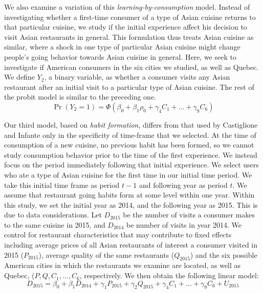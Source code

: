 \documentclass[Journal,letterpaper, NoLineNumbers]{ascelike-new}
\begin{document}
We also examine a variation of this \textit{learning-by-consumption} model. Instead of investigating whether a first-time consumer of a type of Asian cuisine returns to that particular cuisine, we study if the initial experience affect his decision to visit Asian restaurants in general. This formulation thus treats Asian cuisine as similar, where a shock in one type of particular Asian cuisine might change people's going behavior towards Asian cuisine in general. Here, we seek to investigate if American consumers in the six cities we studied, as well as Quebec. We define $Y_2$, a binary variable, as whether a consumer visits any Asian restaurant after an initial visit to a particular type of Asian cuisine. The rest of the probit model is similar to the preceding one.
\begin{equation}
\Pr(Y_2 = 1) = \Phi(\beta_0 + \beta_1\rho_{0} + \gamma_4C_1 + ... + \gamma_9C_6)
\end{equation}

Our third model, based on \textit{habit formation}, differs from that used by Castiglione and Infante only in the specificity of time-frame that we selected. At the time of consumption of a new cuisine, no previous habit has been formed, so we cannot study consumption behavior prior to the time of the first experience. We instead focus on the period immediately following that initial experience. We select users who ate a type of Asian cuisine for the first time in our initial time period. We take this initial time frame as period $t-1$ and following year as period $t$. We assume that restaurant going habits form at some level within one year. Within this study, we set the initial year as 2014, and the following year as 2015. This is due to data considerations. Let $D_{2015}$ be the number of visits a consumer makes to the same cuisine in 2015, and $D_{2014}$ be number of visits in year 2014. We control for restaurant characteristics that may contribute to fixed effects including average prices of all Asian restaurants of interest a consumer visited in 2015 ($P_{2015}$), average quality of the same restaurants ($Q_{2015}$) and the six possible American cities in which the restaurants we examine are located, as well as Quebec, ($P, Q, C_1, ..., C_6$, respectively. We then obtain the following linear model: 
\begin{equation}
D_{2015} = \beta_0 + \beta_1D_{2014} + \gamma_1P_{2015} + \gamma_2Q_{2015} + \gamma_4C_1 + ... + \gamma_9C_6 + U_{2015}
\end{equation}
\end{document}
